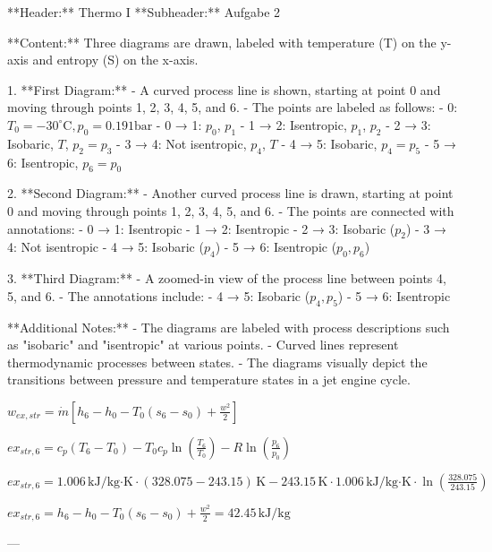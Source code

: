 **Header:** Thermo I  
**Subheader:** Aufgabe 2  

**Content:**  
Three diagrams are drawn, labeled with temperature (T) on the y-axis and entropy (S) on the x-axis.  

1. **First Diagram:**  
   - A curved process line is shown, starting at point 0 and moving through points 1, 2, 3, 4, 5, and 6.  
   - The points are labeled as follows:  
     - 0: \( T_0 = -30^\circ \text{C}, p_0 = 0.191 \text{bar} \)  
     - 0 → 1: \( p_0 \), \( p_1 \)  
     - 1 → 2: Isentropic, \( p_1 \), \( p_2 \)  
     - 2 → 3: Isobaric, \( T \), \( p_2 = p_3 \)  
     - 3 → 4: Not isentropic, \( p_4 \), \( T \)  
     - 4 → 5: Isobaric, \( p_4 = p_5 \)  
     - 5 → 6: Isentropic, \( p_6 = p_0 \)  

2. **Second Diagram:**  
   - Another curved process line is drawn, starting at point 0 and moving through points 1, 2, 3, 4, 5, and 6.  
   - The points are connected with annotations:  
     - 0 → 1: Isentropic  
     - 1 → 2: Isentropic  
     - 2 → 3: Isobaric (\( p_2 \))  
     - 3 → 4: Not isentropic  
     - 4 → 5: Isobaric (\( p_4 \))  
     - 5 → 6: Isentropic (\( p_0, p_6 \))  

3. **Third Diagram:**  
   - A zoomed-in view of the process line between points 4, 5, and 6.  
   - The annotations include:  
     - 4 → 5: Isobaric (\( p_4, p_5 \))  
     - 5 → 6: Isentropic  

**Additional Notes:**  
- The diagrams are labeled with process descriptions such as "isobaric" and "isentropic" at various points.  
- Curved lines represent thermodynamic processes between states.  
- The diagrams visually depict the transitions between pressure and temperature states in a jet engine cycle.

\( w_{ex,str} = \dot{m} \left[ h_6 - h_0 - T_0 \left( s_6 - s_0 \right) + \frac{w^2}{2} \right] \)  

\( ex_{str,6} = c_p \left( T_6 - T_0 \right) - T_0 c_p \ln \left( \frac{T_6}{T_0} \right) - R \ln \left( \frac{p_6}{p_0} \right) \)  

\( ex_{str,6} = 1.006 \, \text{kJ/kg·K} \cdot \left( 328.075 - 243.15 \right) \, \text{K} - 243.15 \, \text{K} \cdot 1.006 \, \text{kJ/kg·K} \cdot \ln \left( \frac{328.075}{243.15} \right) \)  

\( ex_{str,6} = h_6 - h_0 - T_0 \left( s_6 - s_0 \right) + \frac{w^2}{2} = 42.45 \, \text{kJ/kg} \)  

---